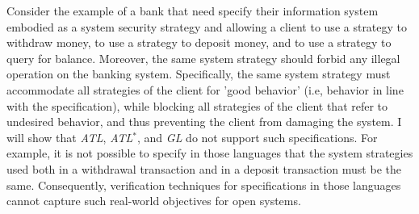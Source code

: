 Consider the example of a bank that need specify their information system embodied as a system security strategy and allowing a client to use a strategy to withdraw money, to use a strategy to deposit money, and to use a strategy to query for balance.
Moreover, the same system strategy should forbid any illegal operation on the banking system.  
Specifically, the same system strategy must accommodate all strategies of the client for 'good behavior' (i.e, behavior in line with the specification), while blocking all strategies of the client that refer to undesired behavior, and thus preventing the client from damaging the system.
I will show that {\em ATL}, {\em ATL}$^*$, and {\em GL} \cite{AHK02} do not support such specifications.  
For example, it is not possible to specify in those languages that the system strategies used both in a withdrawal transaction and in a deposit transaction must be the same.  
Consequently, verification techniques for specifications in those languages cannot capture such real-world objectives for open systems.  

